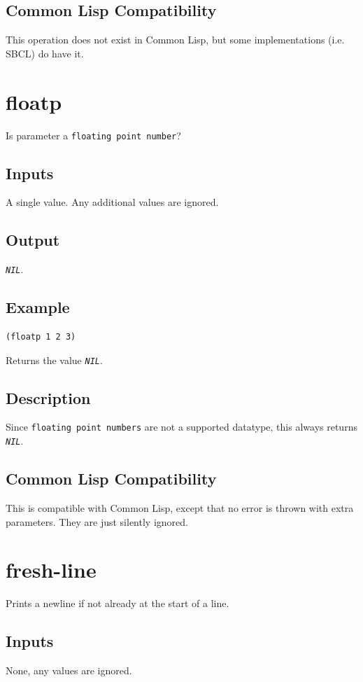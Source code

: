 \documentclass[10pt, openany]{book}
\newcommand{\constant}[1]{\emph{\texttt{#1}}}
\newcommand{\datatype}[1]{\texttt{#1}}
\newcommand{\cl}{Common Lisp}
\begin{document}
\subsection{Common Lisp Compatibility}
This operation does not exist in \cl, but some implementations (i.e. SBCL) do have it.

\section{floatp}
Is parameter a \datatype{floating point number}?
\subsection{Inputs}
A single value.  Any additional values are ignored.
\subsection{Output}
\constant{NIL}.
\subsection{Example}
\begin{lstlisting}
(floatp 1 2 3)
\end{lstlisting}
Returns the value \constant{NIL}.
\subsection{Description}
Since \datatype{floating point numbers} are not a supported datatype, this always returns \constant{NIL}.
\subsection{Common Lisp Compatibility}
This is compatible with \cl, except that no error is thrown with extra parameters.  They are just silently ignored.

\section{fresh-line}
Prints a newline if not already at the start of a line.
\subsection{Inputs}
None, any values are ignored.
\end{document}
